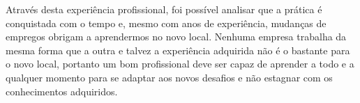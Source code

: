 \documentclass[
	12pt,				%
	oneside,			%
	a4paper,			%
	chapter=TITLE,		%
	section=TITLE,		%
	sumario=tradicional %
	english,			%
	french,				%
	spanish,			%
	brazil				%
	]{abntex2}
\begin{document}
Através desta experiência profissional, foi possível analisar que a prática é conquistada com o tempo e, mesmo com anos de experiência, mudanças de empregos obrigam a aprendermos no novo local. Nenhuma empresa trabalha da mesma forma que a outra e talvez a experiência adquirida não é o bastante para o novo local, portanto um bom profissional deve ser capaz de aprender a todo e a qualquer momento para se adaptar aos novos desafios e não estagnar com os conhecimentos adquiridos.


%

\postextual

%


\printindex
\end{document}
